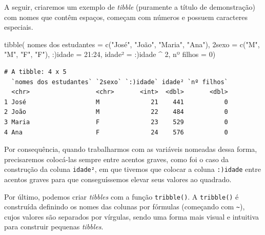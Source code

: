 \documentclass[
  brazilian,
]{book}
\newenvironment{Shaded}{\begin{snugshade}}{\end{snugshade}}
\newcommand{\AttributeTok}[1]{\textcolor[rgb]{0.77,0.63,0.00}{#1}}
\newcommand{\DecValTok}[1]{\textcolor[rgb]{0.00,0.00,0.81}{#1}}
\newcommand{\FunctionTok}[1]{\textcolor[rgb]{0.00,0.00,0.00}{#1}}
\newcommand{\NormalTok}[1]{#1}
\newcommand{\OtherTok}[1]{\textcolor[rgb]{0.56,0.35,0.01}{#1}}
\newcommand{\SpecialCharTok}[1]{\textcolor[rgb]{0.00,0.00,0.00}{#1}}
\newcommand{\StringTok}[1]{\textcolor[rgb]{0.31,0.60,0.02}{#1}}
\begin{document}
A seguir, criaremos um exemplo de \emph{tibble} (puramente a título de demonstração) com nomes que contêm espaços, começam com números e possuem caracteres especiais.

\begin{Shaded}
\begin{Highlighting}[]
\FunctionTok{tibble}\NormalTok{(}
  \StringTok{\textasciigrave{}}\AttributeTok{nomes dos estudantes}\StringTok{\textasciigrave{}} \OtherTok{=} \FunctionTok{c}\NormalTok{(}\StringTok{"José"}\NormalTok{, }\StringTok{"João"}\NormalTok{, }\StringTok{"Maria"}\NormalTok{, }\StringTok{"Ana"}\NormalTok{),}
  \StringTok{\textasciigrave{}}\AttributeTok{2sexo}\StringTok{\textasciigrave{}} \OtherTok{=} \FunctionTok{c}\NormalTok{(}\StringTok{"M"}\NormalTok{, }\StringTok{"M"}\NormalTok{, }\StringTok{"F"}\NormalTok{, }\StringTok{"F"}\NormalTok{),}
  \StringTok{\textasciigrave{}}\AttributeTok{:)idade}\StringTok{\textasciigrave{}} \OtherTok{=} \DecValTok{21}\SpecialCharTok{:}\DecValTok{24}\NormalTok{,}
  \StringTok{\textasciigrave{}}\AttributeTok{idade²}\StringTok{\textasciigrave{}} \OtherTok{=} \StringTok{\textasciigrave{}}\AttributeTok{:)idade}\StringTok{\textasciigrave{}} \SpecialCharTok{\^{}} \DecValTok{2}\NormalTok{,}
  \StringTok{\textasciigrave{}}\AttributeTok{nº filhos}\StringTok{\textasciigrave{}} \OtherTok{=} \DecValTok{0}\NormalTok{)}
\end{Highlighting}
\end{Shaded}

\begin{verbatim}
# A tibble: 4 x 5
  `nomes dos estudantes` `2sexo` `:)idade` idade² `nº filhos`
  <chr>                  <chr>       <int>  <dbl>       <dbl>
1 José                   M              21    441           0
2 João                   M              22    484           0
3 Maria                  F              23    529           0
4 Ana                    F              24    576           0
\end{verbatim}

Por consequência, quando trabalharmos com as variáveis nomeadas dessa forma, precisaremos colocá-las sempre entre acentos graves, como foi o caso da construção da coluna \texttt{idade²}, em que tivemos que colocar a coluna \texttt{:)idade} entre acentos graves para que conseguíssemos elevar seus valores ao quadrado.

Por último, podemos criar \emph{tibbles} com a função \texttt{tribble()}. A \texttt{tribble()} é construída definindo os nomes das colunas por fórmulas (começando com \texttt{\textasciitilde{}}), cujos valores são separados por vírgulas, sendo uma forma mais visual e intuitiva para construir pequenas \emph{tibbles}.
\end{document}
